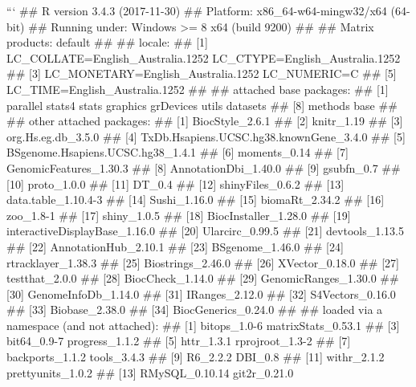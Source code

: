 ```
## R version 3.4.3 (2017-11-30)
## Platform: x86_64-w64-mingw32/x64 (64-bit)
## Running under: Windows >= 8 x64 (build 9200)
## 
## Matrix products: default
## 
## locale:
## [1] LC_COLLATE=English_Australia.1252  LC_CTYPE=English_Australia.1252   
## [3] LC_MONETARY=English_Australia.1252 LC_NUMERIC=C                      
## [5] LC_TIME=English_Australia.1252    
## 
## attached base packages:
## [1] parallel  stats4    stats     graphics  grDevices utils     datasets 
## [8] methods   base     
## 
## other attached packages:
##  [1] BiocStyle_2.6.1                        
##  [2] knitr_1.19                             
##  [3] org.Hs.eg.db_3.5.0                     
##  [4] TxDb.Hsapiens.UCSC.hg38.knownGene_3.4.0
##  [5] BSgenome.Hsapiens.UCSC.hg38_1.4.1      
##  [6] moments_0.14                           
##  [7] GenomicFeatures_1.30.3                 
##  [8] AnnotationDbi_1.40.0                   
##  [9] gsubfn_0.7                             
## [10] proto_1.0.0                            
## [11] DT_0.4                                 
## [12] shinyFiles_0.6.2                       
## [13] data.table_1.10.4-3                    
## [14] Sushi_1.16.0                           
## [15] biomaRt_2.34.2                         
## [16] zoo_1.8-1                              
## [17] shiny_1.0.5                            
## [18] BiocInstaller_1.28.0                   
## [19] interactiveDisplayBase_1.16.0          
## [20] Ularcirc_0.99.5                        
## [21] devtools_1.13.5                        
## [22] AnnotationHub_2.10.1                   
## [23] BSgenome_1.46.0                        
## [24] rtracklayer_1.38.3                     
## [25] Biostrings_2.46.0                      
## [26] XVector_0.18.0                         
## [27] testthat_2.0.0                         
## [28] BiocCheck_1.14.0                       
## [29] GenomicRanges_1.30.0                   
## [30] GenomeInfoDb_1.14.0                    
## [31] IRanges_2.12.0                         
## [32] S4Vectors_0.16.0                       
## [33] Biobase_2.38.0                         
## [34] BiocGenerics_0.24.0                    
## 
## loaded via a namespace (and not attached):
##  [1] bitops_1.0-6               matrixStats_0.53.1        
##  [3] bit64_0.9-7                progress_1.1.2            
##  [5] httr_1.3.1                 rprojroot_1.3-2           
##  [7] backports_1.1.2            tools_3.4.3               
##  [9] R6_2.2.2                   DBI_0.8                   
## [11] withr_2.1.2                prettyunits_1.0.2         
## [13] RMySQL_0.10.14             git2r_0.21.0              
